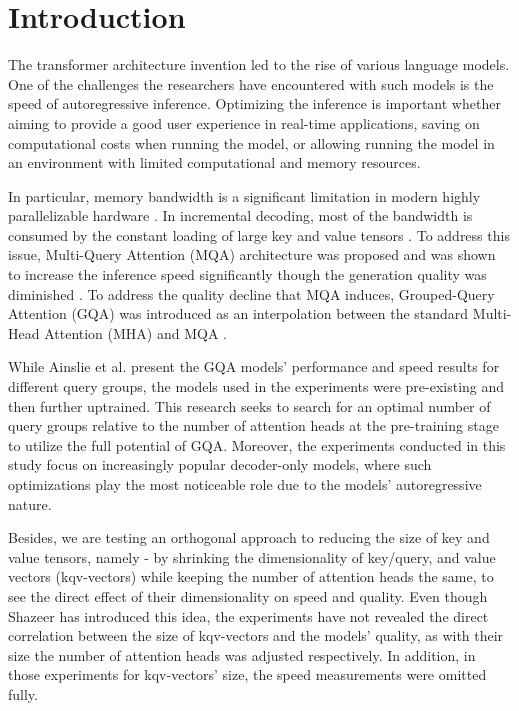 \section{Introduction}
The transformer architecture invention led to the rise of various language models. One of the challenges the researchers have encountered with such models is the speed of autoregressive inference. Optimizing the inference is important whether aiming to provide a good user experience in real-time applications, saving on computational costs when running the model, or allowing running the model in an environment with limited computational and memory resources. 

In particular, memory bandwidth is a significant limitation in modern highly parallelizable hardware \cite{pope_efficiently_2022}\cite{shazeer_fast_2019}\cite{williams_roofline_2009}. In incremental decoding, most of the bandwidth is consumed by the constant loading of large key and value tensors \cite{shazeer_fast_2019}. To address this issue, Multi-Query Attention (MQA) architecture was proposed and was shown to increase the inference speed significantly though the generation quality was diminished \cite{shazeer_fast_2019}. To address the quality decline that MQA induces, Grouped-Query Attention (GQA) was introduced as an interpolation between the standard Multi-Head Attention (MHA) and MQA \cite{ainslie_gqa_2023}.

While Ainslie et al. \cite{ainslie_gqa_2023} present the GQA models' performance and speed results for different query groups, the models used in the experiments were pre-existing and then further uptrained. This research seeks to search for an optimal number of query groups relative to the number of attention heads at the pre-training stage to utilize the full potential of GQA. Moreover, the experiments conducted in this study focus on increasingly popular decoder-only models, where such optimizations play the most noticeable role due to the models' autoregressive nature. 

Besides, we are testing an orthogonal approach to reducing the size of key and value tensors, namely - by shrinking the dimensionality of key/query, and value vectors (kqv-vectors) while keeping the number of attention heads the same, to see the direct effect of their dimensionality on speed and quality. Even though Shazeer \cite{shazeer_fast_2019} has introduced this idea, the experiments have not revealed the direct correlation between the size of kqv-vectors and the models' quality, as with their size the number of attention heads was adjusted respectively. In addition, in those experiments for kqv-vectors' size, the speed measurements were omitted fully. 

